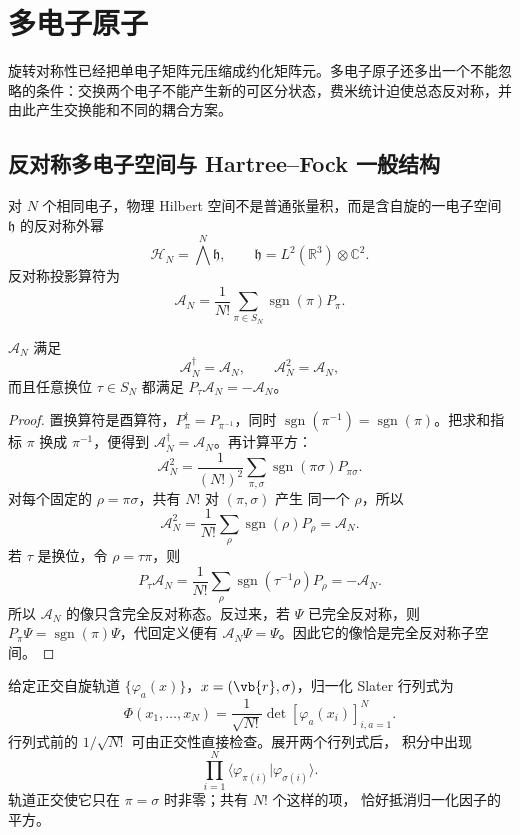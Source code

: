 \section{多电子原子}
\label{chap:many-electron-atoms}

旋转对称性已经把单电子矩阵元压缩成约化矩阵元。多电子原子还多出一个不能忽略的条件：交换两个电子不能产生新的可区分状态，费米统计迫使总态反对称，并由此产生交换能和不同的耦合方案。

\subsection{反对称多电子空间与 Hartree--Fock 一般结构}

对 $N$ 个相同电子，物理 Hilbert 空间不是普通张量积，而是含自旋的一电子空间 $\mathfrak h$ 的反对称外幂
\begin{equation}
\mathcal H_N=\bigwedge^N\mathfrak h,
\qquad
\mathfrak h=L^2(\mathbb R^3)\otimes\mathbb C^2.
\label{eq:am-fermion-hilbert}
\end{equation}
反对称投影算符为
\[
\mathcal A_N
=\frac{1}{N!}\sum_{\pi\in S_N}\operatorname{sgn}(\pi)P_\pi.
\]
\begin{proposition}[反对称化算符确为正交投影]
$\mathcal A_N$ 满足
\[
\mathcal A_N^\dagger=\mathcal A_N,\qquad
\mathcal A_N^2=\mathcal A_N,
\]
而且任意换位 $\tau\in S_N$ 都满足
$P_\tau\mathcal A_N=-\mathcal A_N$。
\end{proposition}

\begin{proof}
置换算符是酉算符，$P_\pi^\dagger=P_{\pi^{-1}}$，同时
$\operatorname{sgn}(\pi^{-1})=\operatorname{sgn}(\pi)$。把求和指标
$\pi$ 换成 $\pi^{-1}$，便得到
$\mathcal A_N^\dagger=\mathcal A_N$。再计算平方：
\[
\mathcal A_N^2
=\frac1{(N!)^2}
\sum_{\pi,\sigma}
\operatorname{sgn}(\pi\sigma)P_{\pi\sigma}.
\]
对每个固定的 $\rho=\pi\sigma$，共有 $N!$ 对 $(\pi,\sigma)$ 产生
同一个 $\rho$，所以
\[
\mathcal A_N^2
=\frac1{N!}\sum_\rho\operatorname{sgn}(\rho)P_\rho
=\mathcal A_N.
\]
若 $\tau$ 是换位，令 $\rho=\tau\pi$，则
\[
P_\tau\mathcal A_N
=\frac1{N!}\sum_\rho
\operatorname{sgn}(\tau^{-1}\rho)P_\rho
=-\mathcal A_N.
\]
所以 $\mathcal A_N$ 的像只含完全反对称态。反过来，若
$\Psi$ 已完全反对称，则
$P_\pi\Psi=\operatorname{sgn}(\pi)\Psi$，代回定义便有
$\mathcal A_N\Psi=\Psi$。因此它的像恰是完全反对称子空间。
\end{proof}

给定正交自旋轨道 $\{\varphi_a(x)\}$，$x=(\vb{r},\sigma)$，归一化 Slater 行列式为
\begin{equation}
\Phi(x_1,\ldots,x_N)
=\frac{1}{\sqrt{N!}}\det[\varphi_a(x_i)]_{i,a=1}^{N}.
\label{eq:am-slater-determinant}
\end{equation}
行列式前的 $1/\sqrt{N!}$ 可由正交性直接检查。展开两个行列式后，
积分中出现
\[
\prod_{i=1}^N
\langle\varphi_{\pi(i)}|\varphi_{\sigma(i)}\rangle.
\]
轨道正交使它只在 $\pi=\sigma$ 时非零；共有 $N!$ 个这样的项，
恰好抵消归一化因子的平方。

